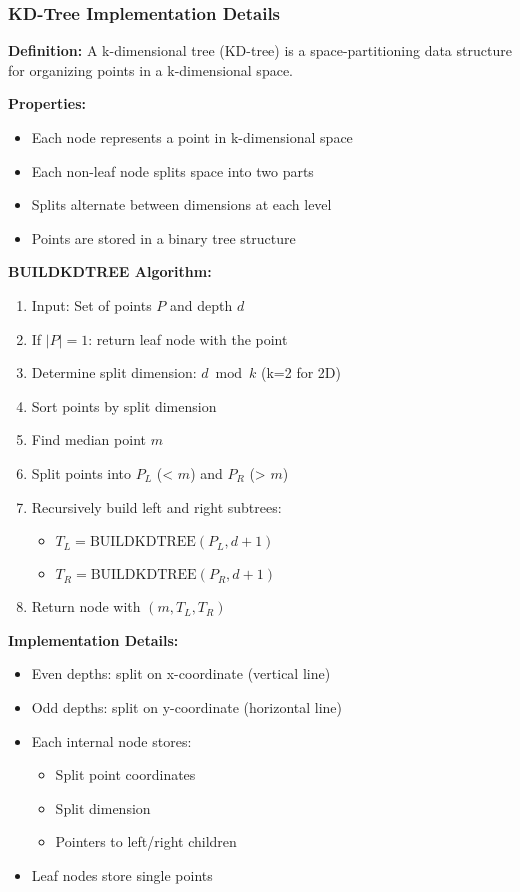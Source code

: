 \FloatBarrier

\subsubsection{KD-Tree Implementation Details}
\textbf{Definition:} A k-dimensional tree (KD-tree) is a space-partitioning data structure for organizing points in a k-dimensional space.

\textbf{Properties:}
\begin{itemize}[noitemsep,leftmargin=*]
    \item Each node represents a point in k-dimensional space
    \item Each non-leaf node splits space into two parts
    \item Splits alternate between dimensions at each level
    \item Points are stored in a binary tree structure
\end{itemize}

\textbf{BUILDKDTREE Algorithm:}
\begin{enumerate}[noitemsep,leftmargin=*]
    \item Input: Set of points $P$ and depth $d$
    \item If $|P| = 1$: return leaf node with the point
    \item Determine split dimension: $d \bmod k$ (k=2 for 2D)
    \item Sort points by split dimension
    \item Find median point $m$
    \item Split points into $P_L$ (< $m$) and $P_R$ (> $m$)
    \item Recursively build left and right subtrees:
        \begin{itemize}[noitemsep]
            \item $T_L = \text{BUILDKDTREE}(P_L, d+1)$
            \item $T_R = \text{BUILDKDTREE}(P_R, d+1)$
        \end{itemize}
    \item Return node with $(m, T_L, T_R)$
\end{enumerate}

\textbf{Implementation Details:}
\begin{itemize}[noitemsep,leftmargin=*]
    \item Even depths: split on x-coordinate (vertical line)
    \item Odd depths: split on y-coordinate (horizontal line)
    \item Each internal node stores:
        \begin{itemize}[noitemsep]
            \item Split point coordinates
            \item Split dimension
            \item Pointers to left/right children
        \end{itemize}
    \item Leaf nodes store single points
\end{itemize}

